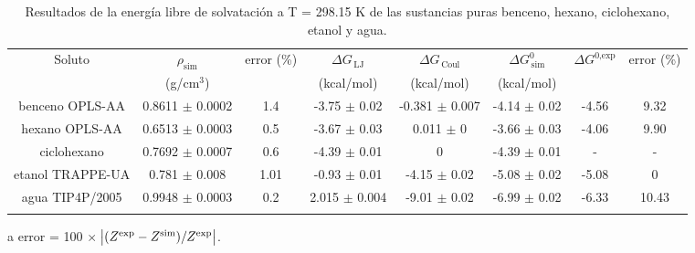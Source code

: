\documentclass[3p,twocolumn]{elsarticle}
\begin{document}
\begin{table}
\centering
\begin{adjustbox}{width=1\textwidth}
\begin{threeparttable}
\caption{Resultados de la energía libre de solvatación a T = 298.15 K de las sustancias puras benceno, hexano, ciclohexano, etanol y agua.}
\begin{tabular}{ c c c c c c c c }
\toprule
Soluto & $\rho_{\text{sim}}$ & error (\%)\tnote{a} & $\Delta G_{\,\text{LJ}}$  & $\Delta G_{\,\text{Coul}}$  & $\Delta G^{0}_{\,\text{sim}}$ & $\Delta G^{\text{0,exp}}$   & error (\%)\tnote{a}\\
 & (g/cm$^{3}$) &  & (kcal/mol) &  (kcal/mol) &  (kcal/mol)   &  \\
\hline
benceno OPLS-AA   & 0.8611 $\pm$ 0.0002 & 1.4 & -3.75  $\pm$ 0.02 & -0.381 $\pm$ 0.007 & -4.14 $\pm$ 0.02 & -4.56 & 9.32  \\
hexano OPLS-AA    & 0.6513 $\pm$ 0.0003 & 0.5 & -3.67  $\pm$  0.03 & 0.011 $\pm$ 0 & -3.66 $\pm$ 0.03 & -4.06 & 9.90 \\
ciclohexano & 0.7692 $\pm$ 0.0007 & 0.6 & -4.39 $\pm$ 0.01 & 0 & -4.39 $\pm$ 0.01 & - & -  \\
etanol TRAPPE-UA   & 0.781 $\pm$ 0.008 & 1.01  &-0.93 $\pm$ 0.01 & -4.15 $\pm$ 0.02  & -5.08  $\pm$ 0.02  & -5.08 & 0 \\
agua TIP4P/2005   &  0.9948 $\pm$ 0.0003 & 0.2 & 2.015 $\pm$ 0.004 & -9.01 $\pm$ 0.02 & -6.99 $\pm$ 0.02 & -6.33  &10.43 \\
 \bottomrule
\label{table:mu_solutos} 
\end{tabular}
\begin{tablenotes}
\item[a] error = 100 $\times$ $\abs{(Z^{\text{exp}} - Z^{\text{sim}})/Z^{\text{exp}}}$.
\end{tablenotes}
\end{threeparttable}
\end{adjustbox}
\end{table}
\end{document}
